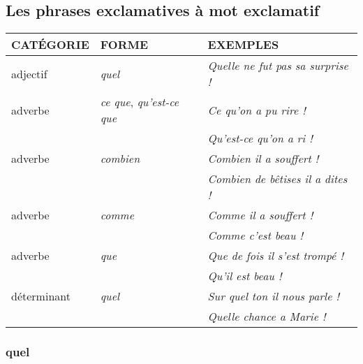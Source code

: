 \documentclass[UTF8]{report}
\begin{document}
\subsection{Les phrases exclamatives à mot exclamatif}


\begin{table}[H]
    \centering 
    \begin{tabular}{|l|l|l|}
    \hline
    \rowcolor{cyan!20}
    \textbf{CATÉGORIE} & \textbf{FORME} & \textbf{EXEMPLES} \\
    \hline
    adjectif & \textit{quel} & \textit{Quelle ne fut pas sa surprise !} \\
    \hline
    adverbe & \textit{ce que}, \textit{qu'est-ce que} & \textit{Ce qu'on a pu rire !} \\
    & & \textit{Qu'est-ce qu'on a ri !} \\
    \hline
    adverbe & \textit{combien} & \textit{Combien il a souffert !} \\
    & & \textit{Combien de bêtises il a dites !} \\
    \hline
    adverbe & \textit{comme} & \textit{Comme il a souffert !} \\
    & & \textit{Comme c'est beau !} \\
    \hline
    adverbe & \textit{que} & \textit{Que de fois il s'est trompé !} \\
    & & \textit{Qu'il est beau !} \\
    \hline
    déterminant & \textit{quel} & \textit{Sur quel ton il nous parle !} \\
    & & \textit{Quelle chance a Marie !} \\
    \hline
    \end{tabular}
\end{table}

\subsubsection{quel}
\end{document}
